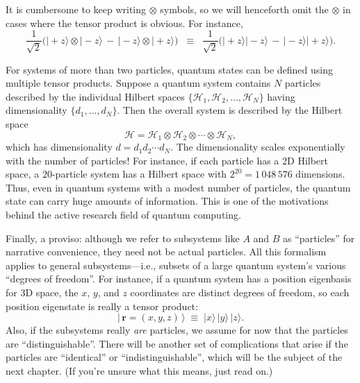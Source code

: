 \documentclass[pra,12pt]{revtex4}
\begin{document}
It is cumbersome to keep writing $\otimes$ symbols, so we will
henceforth omit the $\otimes$ in cases where the tensor product is
obvious.  For instance,
\begin{equation}
  \frac{1}{\sqrt{2}} \Big(|\!+\!z\rangle\otimes|\!-\!z\rangle \,-\, |\!-\!z\rangle\otimes|\!+\!z\rangle\Big) \;\;\equiv \;\; \frac{1}{\sqrt{2}} \Big(|\!+\!z\rangle|\!-\!z\rangle \,-\, |\!-\!z\rangle|\!+\!z\rangle\Big).
\end{equation}

For systems of more than two particles, quantum states can be defined
using multiple tensor products.  Suppose a quantum system contains $N$
particles described by the individual Hilbert spaces $\{\mathscr{H}_1,
\mathscr{H}_2, \dots, \mathscr{H}_N\}$ having dimensionality $\{d_1,
\dots, d_N\}$.  Then the overall system is described by the Hilbert
space
\begin{equation}
  \mathscr{H} = \mathscr{H}_1 \otimes \mathscr{H}_2 \otimes \cdots
  \otimes \mathscr{H}_N,
\end{equation}
which has dimensionality $d = d_1 d_2\cdots d_N$.  The dimensionality
scales exponentially with the number of particles!  For instance, if
each particle has a 2D Hilbert space, a $20$-particle system has a
Hilbert space with $2^{20} =1\,048\,576$ dimensions.  Thus, even in
quantum systems with a modest number of particles, the quantum state
can carry huge amounts of information.  This is one of the motivations
behind the active research field of quantum computing.

Finally, a proviso: although we refer to subsystems like $A$ and $B$
as ``particles'' for narrative convenience, they need not be actual
particles.  All this formalism applies to general subsystems---i.e.,
subsets of a large quantum system's various ``degrees of freedom''.
For instance, if a quantum system has a position eigenbasis for 3D
space, the $x$, $y$, and $z$ coordinates are distinct degrees of
freedom, so each position eigenstate is really a tensor product:
\begin{equation*}
  |\,\mathbf{r} = (x,y,z)\,\rangle \;\equiv\; |x\rangle\, |y\rangle\, |z\rangle.
\end{equation*}
Also, if the subsystems really \textit{are} particles, we assume for
now that the particles are ``distinguishable''.  There will be another
set of complications that arise if the particles are ``identical'' or
``indistinguishable'', which will be the subject of the next chapter.
(If you're unsure what this means, just read on.)
\end{document}
